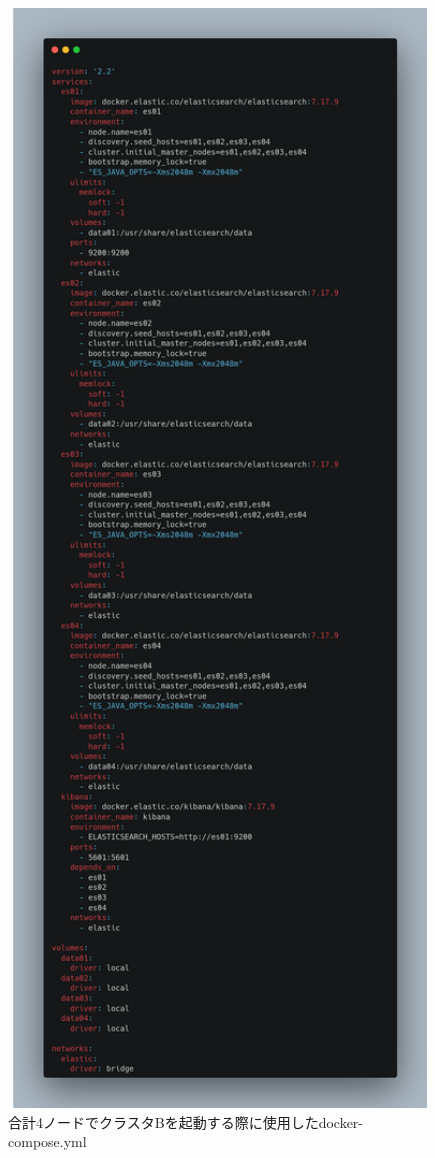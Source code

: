 \documentclass[a4j,12pt,]{jarticle}
\begin{document}
\begin{figure}[H]
  \begin{center}
    \includegraphics[width=160mm]{4nodes.png}
    \caption{合計4ノードでクラスタBを起動する際に使用したdocker-compose.yml}
    \label{p3}
  \end{center}
\end{figure}
\end{document}
